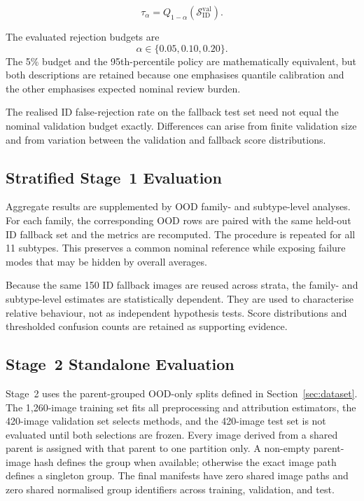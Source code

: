 \documentclass[fleqn,12pt]{olplainarticle}
\begin{document}
\begin{equation}
    \tau_{\alpha}
    =
    Q_{1-\alpha}
    \left(
        \mathcal{S}_{\mathrm{ID}}^{\mathrm{val}}
    \right).
    \label{eq:protocol_rejection_budget}
\end{equation}

The evaluated rejection budgets are
\[
    \alpha\in\{0.05,0.10,0.20\}.
\]
The 5\% budget and the
95th-percentile policy are mathematically equivalent, but both descriptions
are retained because one emphasises quantile calibration and the other
emphasises expected nominal review burden.

The realised ID false-rejection rate on the fallback test set need not equal
the nominal validation budget exactly. Differences can arise from finite
validation size and from variation between the validation and fallback score
distributions.

\subsection{Stratified Stage~1 Evaluation}
\label{subsec:stratified_evaluation}

Aggregate results are supplemented by OOD family- and subtype-level analyses.
For each family, the corresponding OOD rows are paired with the same held-out
ID fallback set and the metrics are recomputed. The procedure is repeated for
all 11 subtypes. This preserves a common nominal reference while exposing
failure modes that may be hidden by overall averages.

Because the same 150 ID fallback images are reused across strata, the
family- and subtype-level estimates are statistically dependent. They are
used to characterise relative behaviour, not as independent hypothesis tests.
Score distributions and thresholded confusion counts are retained as
supporting evidence.

\subsection{Stage~2 Standalone Evaluation}
\label{subsec:stage2_evaluation_protocol}

Stage~2 uses the parent-grouped OOD-only splits defined in
Section~\ref{sec:dataset}. The 1,260-image training set fits all preprocessing
and attribution estimators, the 420-image validation set selects methods, and
the 420-image test set is not evaluated until both selections are frozen.
Every image derived from a shared parent is assigned with that parent to one
partition only. A non-empty parent-image hash defines the group when available;
otherwise the exact image path defines a singleton group. The final manifests
have zero shared image paths and zero shared normalised group identifiers
across training, validation, and test.
\end{document}
